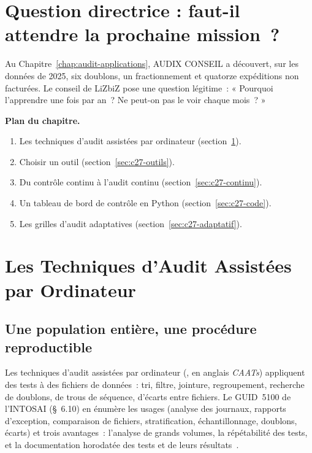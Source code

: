 \bigskip

\section*{Question directrice : faut-il attendre la prochaine mission~?}

Au Chapitre~\ref{chap:audit-applications}, AUDIX CONSEIL a découvert, sur
les données de 2025, six doublons, un fractionnement et quatorze
expéditions non facturées. Le conseil de LiZbiZ pose une question
légitime~: « Pourquoi l'apprendre une fois par an~? Ne peut-on pas le voir
chaque mois~? »

\medskip
\textbf{Plan du chapitre.}
\begin{enumerate}
    \item Les techniques d'audit assistées par ordinateur (section~\ref{sec:c27-taao}).
    \item Choisir un outil (section~\ref{sec:c27-outils}).
    \item Du contrôle continu à l'audit continu (section~\ref{sec:c27-continu}).
    \item Un tableau de bord de contrôle en Python (section~\ref{sec:c27-code}).
    \item Les grilles d'audit adaptatives (section~\ref{sec:c27-adaptatif}).
\end{enumerate}

\separateur

\section{Les Techniques d'Audit Assistées par Ordinateur}
\label{sec:c27-taao}

\subsection{Une population entière, une procédure reproductible}

Les techniques d'audit assistées par ordinateur (, en anglais
\textit{CAATs}) appliquent des tests à des fichiers de données~: tri,
filtre, jointure, regroupement, recherche de doublons, de trous de
séquence, d'écarts entre fichiers. Le GUID~5100 de l'INTOSAI (§~6.10) en
énumère les usages (analyse des journaux, rapports d'exception,
comparaison de fichiers, stratification, échantillonnage, doublons,
écarts) et trois avantages~: l'analyse de grands volumes, la répétabilité
des tests, et la documentation horodatée des tests et de leurs
résultats~\cite{intosai2019guid5100}.

